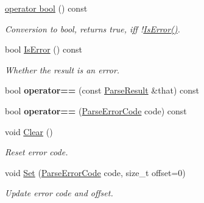 \begin{DoxyCompactItemize}
\mbox{\label{structParseResult_a4cec9590497f982dec42e9f0763d5d73}} 
\hyperlink{structParseResult_a4cec9590497f982dec42e9f0763d5d73}{operator bool} () const
\begin{DoxyCompactList}\small\item\em Conversion to {\ttfamily bool}, returns {\ttfamily true}, iff !\hyperlink{structParseResult_adfe0ef5b994e82f8aa9ebf0b30c924b1}{Is\+Error()}. \end{DoxyCompactList}\item 
\mbox{\label{structParseResult_adfe0ef5b994e82f8aa9ebf0b30c924b1}} 
bool \hyperlink{structParseResult_adfe0ef5b994e82f8aa9ebf0b30c924b1}{Is\+Error} () const
\begin{DoxyCompactList}\small\item\em Whether the result is an error. \end{DoxyCompactList}\item 
\mbox{\label{structParseResult_a4d98465a5dc6055e367a7ea7089fc73d}} 
bool {\bfseries operator==} (const \hyperlink{structParseResult}{Parse\+Result} \&that) const
\item 
\mbox{\label{structParseResult_a6de18a7e43013b2defc51d892c2cf90f}} 
bool {\bfseries operator==} (\hyperlink{group__RAPIDJSON__ERRORS_ga8d4b32dfc45840bca189ade2bbcb6ba7}{Parse\+Error\+Code} code) const
\item 
\mbox{\label{structParseResult_a88b6d44f052a19e6436ae6aadc2c40b4}} 
void \hyperlink{structParseResult_a88b6d44f052a19e6436ae6aadc2c40b4}{Clear} ()
\begin{DoxyCompactList}\small\item\em Reset error code. \end{DoxyCompactList}\item 
\mbox{\label{structParseResult_aa81b4a7b776b77216cb752385203a8c1}} 
void \hyperlink{structParseResult_aa81b4a7b776b77216cb752385203a8c1}{Set} (\hyperlink{group__RAPIDJSON__ERRORS_ga8d4b32dfc45840bca189ade2bbcb6ba7}{Parse\+Error\+Code} code, size\+\_\+t offset=0)
\begin{DoxyCompactList}\small\item\em Update error code and offset. \end{DoxyCompactList}\end{DoxyCompactItemize}
